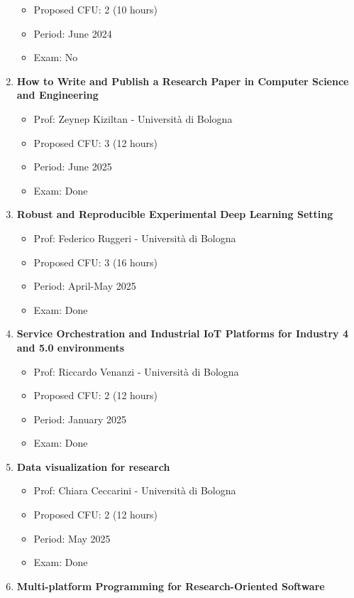 \documentclass[runningheads]{llncs}
\begin{document}
\begin{enumerate}
\begin{itemize}
        \item Proposed CFU: 2 (10 hours) 
        \item Period: June 2024
        \item Exam: No
    \end{itemize}    
    \item \textbf{How to Write and Publish a Research Paper in Computer Science and Engineering} 
    \begin{itemize}
        \item Prof: Zeynep Kiziltan - Università di Bologna      
        \item Proposed CFU: 3 (12 hours) 
        \item Period: June 2025
        \item Exam: Done
    \end{itemize}  
    \item \textbf{Robust and Reproducible Experimental Deep Learning Setting} 
    \begin{itemize}
        \item Prof: Federico Ruggeri - Università di Bologna      
        \item Proposed CFU: 3 (16 hours) 
        \item Period: April-May 2025
        \item Exam: Done
    \end{itemize} 
    \item \textbf{Service Orchestration and Industrial IoT Platforms for Industry 4 and 5.0 environments} 
    \begin{itemize}
        \item Prof: Riccardo Venanzi - Università di Bologna      
        \item Proposed CFU: 2 (12 hours) 
        \item Period: January 2025
        \item Exam: Done
    \end{itemize} 
    \item \textbf{Data visualization for research} 
    \begin{itemize}
        \item Prof: Chiara Ceccarini - Università di Bologna      
        \item Proposed CFU: 2 (12 hours) 
        \item Period: May 2025
        \item Exam: Done
    \end{itemize} 
    \item \textbf{Multi-platform Programming for Research-Oriented Software} 

\end{enumerate}
\end{document}
